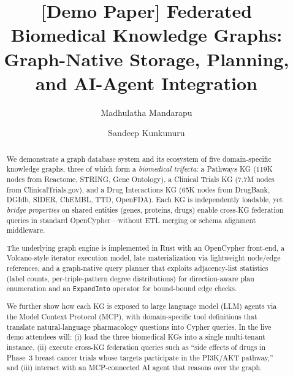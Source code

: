 \documentclass[sigconf]{acmart}
\begin{document}
\author{Madhulatha Mandarapu}

\author{Sandeep Kunkunuru}


\title{[Demo Paper] Federated Biomedical Knowledge Graphs:\\Graph-Native Storage, Planning, and AI-Agent Integration}

\begin{abstract}
We demonstrate a graph database system and its ecosystem of five
domain-specific knowledge graphs, three of which form a \emph{biomedical
trifecta}: a Pathways KG (119K nodes from Reactome, STRING, Gene
Ontology), a Clinical Trials KG (7.7M nodes from ClinicalTrials.gov),
and a Drug Interactions KG (65K nodes from DrugBank, DGIdb, SIDER,
ChEMBL, TTD, OpenFDA).  Each KG is independently loadable, yet
\emph{bridge properties} on shared entities (genes, proteins, drugs)
enable cross-KG federation queries in standard OpenCypher---without
ETL merging or schema alignment middleware.

The underlying graph engine is implemented in Rust with an
OpenCypher front-end, a Volcano-style iterator execution model,
late materialization via lightweight node/edge references, and a
graph-native query planner that exploits adjacency-list statistics
(label counts, per-triple-pattern degree distributions) for
direction-aware plan enumeration and an \texttt{ExpandInto}
operator for bound-bound edge checks.

We further show how each KG is exposed to large language model
(LLM) agents via the Model Context Protocol (MCP), with
domain-specific tool definitions that translate natural-language
pharmacology questions into Cypher queries.  In the live demo
attendees will: (i) load the three biomedical KGs into a single
multi-tenant instance, (ii) execute cross-KG federation queries
such as ``side effects of drugs in Phase~3 breast cancer trials
whose targets participate in the PI3K/AKT pathway,'' and
(iii) interact with an MCP-connected AI agent that reasons over
the graph.
\end{abstract}

\maketitle

\end{document}

